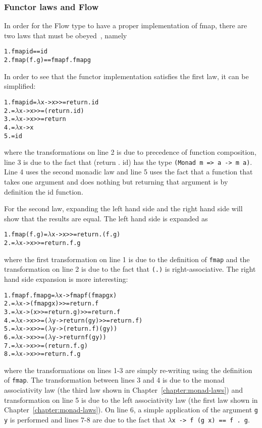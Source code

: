 \subsubsection{Functor laws and Flow}
In order for the Flow type to have a proper implementation of fmap, there are two laws that must be obeyed~\cite{functor-laws}, namely
\begin{alltt}
  1.  fmap id  ==  id
  2.  fmap (f . g)  ==  fmap f . fmap g
\end{alltt}
In order to see that the functor implementation satisfies the first law, it can be simplified:
\begin{alltt}
  1. fmap id = \(\lambda\)x -> x >>= return . id
  2.         = \(\lambda\)x -> x >>= (return . id)
  3.         = \(\lambda\)x -> x >>= return
  4.         = \(\lambda\)x -> x
  5.         = id
\end{alltt}
where the transformations on line 2 is due to precedence of function composition, line 3 is due to the fact that (return . id) has the type {\tt (Monad m => a -> m a)}. Line 4 uses the second monadic law and line 5 uses the fact that a function that takes one argument and does nothing but returning that argument is by definition the id function.

For the second law, expanding the left hand side and the right hand side will show that the results are equal. The left hand side is expanded as
\begin{alltt}
  1. fmap (f . g) = \(\lambda\)x -> x >>= return . (f . g)
  2.              = \(\lambda\)x -> x >>= return . f . g
\end{alltt}
where the first transformation on line 1 is due to the definition of {\tt fmap} and the transformation on line 2 is due to the fact that {\tt (.)} is right-associative.
\newline
\newline
The right hand side expansion is more interesting:
\begin{alltt}
  1. fmap f . fmap g = \(\lambda\)x -> fmap f (fmap g x)
  2.                 = \(\lambda\)x -> (fmap g x) >>= return . f
  3.                 = \(\lambda\)x -> (x >>= return . g) >>= return . f
  4.                 = \(\lambda\)x -> x >>= (\(\lambda\)y -> return (g y) >>= return . f)
  5.                 = \(\lambda\)x -> x >>= (\(\lambda\)y -> (return . f) (g y))
  6.                 = \(\lambda\)x -> x >>= (\(\lambda\)y -> return f (g y))
  7.                 = \(\lambda\)x -> x >>= (return . f . g)
  8.                 = \(\lambda\)x -> x >>= return . f . g
\end{alltt}
where the transformations on lines 1-3 are simply re-writing using the definition of {\tt fmap}. The transformation between lines 3 and 4 is due to the monad associativity law (the third law shown in Chapter~\ref{chapter:monad-laws}) and transformation on line 5 is due to the left associativity law (the first law shown in Chapter~\ref{chapter:monad-laws}). On line 6, a simple application of the argument {\tt g y} is performed and lines 7-8 are due to the fact that {\tt \(\lambda\)x -> f (g x) == f . g}.


